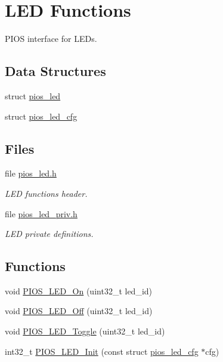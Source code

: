 \hypertarget{group___p_i_o_s___l_e_d}{\section{\-L\-E\-D \-Functions}
\label{group___p_i_o_s___l_e_d}
}


\-P\-I\-O\-S interface for \-L\-E\-Ds.  


\subsection*{\-Data \-Structures}
\begin{DoxyCompactItemize}
\item 
struct \hyperlink{structpios__led}{pios\-\_\-led}
\item 
struct \hyperlink{structpios__led__cfg}{pios\-\_\-led\-\_\-cfg}
\end{DoxyCompactItemize}
\subsection*{\-Files}
\begin{DoxyCompactItemize}
\item 
file \hyperlink{pios__led_8h}{pios\-\_\-led.\-h}
\begin{DoxyCompactList}\small\item\em \-L\-E\-D functions header. \end{DoxyCompactList}\item 
file \hyperlink{pios__led__priv_8h}{pios\-\_\-led\-\_\-priv.\-h}
\begin{DoxyCompactList}\small\item\em \-L\-E\-D private definitions. \end{DoxyCompactList}\end{DoxyCompactItemize}
\subsection*{\-Functions}
\begin{DoxyCompactItemize}
\item 
void \hyperlink{group___p_i_o_s___l_e_d_ga01bdbb3dbc510df35605228515952f41}{\-P\-I\-O\-S\-\_\-\-L\-E\-D\-\_\-\-On} (uint32\-\_\-t led\-\_\-id)
\item 
void \hyperlink{group___p_i_o_s___l_e_d_gac35252f6ff6eee4d950345b66d62703c}{\-P\-I\-O\-S\-\_\-\-L\-E\-D\-\_\-\-Off} (uint32\-\_\-t led\-\_\-id)
\item 
void \hyperlink{group___p_i_o_s___l_e_d_gabbfdd5bda4ecd72780fa1189f5d61840}{\-P\-I\-O\-S\-\_\-\-L\-E\-D\-\_\-\-Toggle} (uint32\-\_\-t led\-\_\-id)
\item 
int32\-\_\-t \hyperlink{group___p_i_o_s___l_e_d_ga9ef731c878c1e48fa760add09e1f2720}{\-P\-I\-O\-S\-\_\-\-L\-E\-D\-\_\-\-Init} (const struct \hyperlink{structpios__led__cfg}{pios\-\_\-led\-\_\-cfg} $\ast$cfg)
\end{DoxyCompactItemize}


